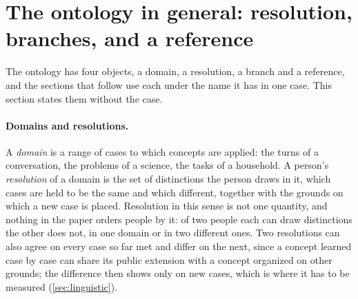 \section{The ontology in general: resolution, branches, and a reference}
\label{sec:general}

The ontology has four objects, a domain, a resolution, a branch and a reference, and the sections that follow use each under the name it has in one case. This section states them without the case.

\paragraph{Domains and resolutions.} A \emph{domain} is a range of cases to which concepts are applied: the turns of a conversation, the problems of a science, the tasks of a household. A person's \emph{resolution} of a domain is the set of distinctions the person draws in it, which cases are held to be the same and which different, together with the grounds on which a new case is placed. Resolution in this sense is not one quantity, and nothing in the paper orders people by it: of two people each can draw distinctions the other does not, in one domain or in two different ones. Two resolutions can also agree on every case so far met and differ on the next, since a concept learned case by case can share its public extension with a concept organized on other grounds; the difference then shows only on new cases, which is where it has to be measured (\autoref{sec:linguistic}).

